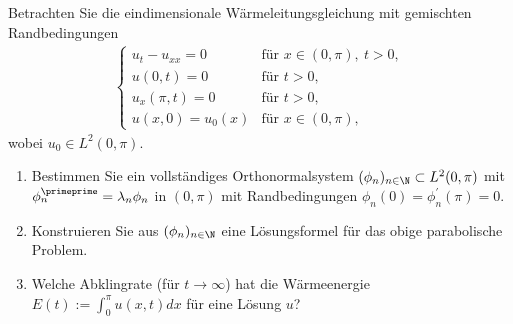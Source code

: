 
\begin{exercise}
Betrachten Sie die eindimensionale Wärmeleitungsgleichung mit gemischten Randbedingungen
\begin{align*}
  \begin{cases}
    u_t - u_{xx} = 0 & \text{für } x \in (0,\pi),\ t > 0, \\
    u(0,t) = 0 & \text{für } t > 0, \\
    u_x(\pi,t) = 0 & \text{für } t > 0, \\
    u(x,0) = u_0(x) & \text{für } x \in (0,\pi),
  \end{cases}
\end{align*}
wobei $u_0 \in L^2(0,\pi)$.
\begin{enumerate}[label = (\roman*)]
  \item Bestimmen Sie ein vollständiges Orthonormalsystem $(\phi_n)_{n \in \N} \subset L^2(0,\pi)$
  mit $\phi^{\primeprime}_n = \lambda_n\phi_n$ in $(0,\pi)$ mit Randbedingungen
  $\phi_n(0) = \phi_n^{\prime}(\pi) = 0.$
  \item Konstruieren Sie aus $(\phi_n)_{n \in \N}$ eine Lösungsformel für das
  obige parabolische Problem.
  \item Welche Abklingrate (für $t \to \infty$) hat die Wärmeenergie
  $E(t) := \int_0^{\pi} u(x,t) dx$ für eine Lösung $u$?
\end{enumerate}



\end{exercise}


